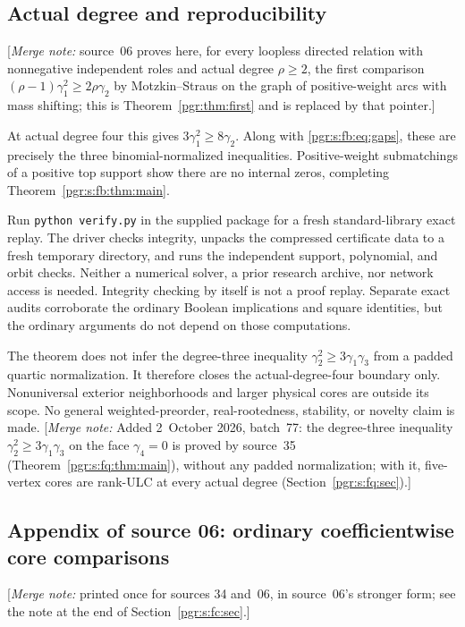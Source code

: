 \documentclass[11pt]{article}
\numberwithin{equation}{section}
\theoremstyle{definition}\newtheorem{definition}[theorem]{Definition}\newtheorem{remark}[theorem]{Remark}
\newcommand{\mnote}[1]{[\textit{Merge note:} #1]}
\begin{document}
\subsection{Actual degree and reproducibility}

\mnote{source~06 proves here, for every loopless directed relation with
nonnegative independent roles and actual degree $\rho\ge2$, the first
comparison $(\rho-1)\gamma_1^2\ge2\rho\gamma_2$ by Motzkin--Straus on the
graph of positive-weight arcs with mass shifting; this is
Theorem~\ref{pgr:thm:first} and is replaced by that pointer.}

At actual degree four this gives $3\gamma_1^2\ge8\gamma_2$. Along with \eqref{pgr:s:fb:eq:gaps}, these are precisely the three binomial-normalized inequalities. Positive-weight submatchings of a positive top support show there are no internal zeros, completing Theorem~\ref{pgr:s:fb:thm:main}.

Run \texttt{python verify.py} in the supplied package for a fresh standard-library exact replay. The driver checks integrity, unpacks the compressed certificate data to a fresh temporary directory, and runs the independent support, polynomial, and orbit checks. Neither a numerical solver, a prior research archive, nor network access is needed. Integrity checking by itself is not a proof replay. Separate exact audits corroborate the ordinary Boolean implications and square identities, but the ordinary arguments do not depend on those computations.

The theorem does not infer the degree-three inequality $\gamma_2^2\ge3\gamma_1\gamma_3$ from a padded quartic normalization. It therefore closes the actual-degree-four boundary only. Nonuniversal exterior neighborhoods and larger physical cores are outside its scope. No general weighted-preorder, real-rootedness, stability, or novelty claim is made.
\mnote{Added 2~October 2026, batch~77: the degree-three inequality
$\gamma_2^2\ge3\gamma_1\gamma_3$ on the face $\gamma_4=0$ is proved by
source~35 (Theorem~\ref{pgr:s:fq:thm:main}), without any padded
normalization; with it, five-vertex cores are rank-ULC at every actual
degree (Section~\ref{pgr:s:fq:sec}).}


\subsection{Appendix of source 06: ordinary coefficientwise core comparisons}\label{pgr:s:fb:app:core}
\mnote{printed once for sources 34 and~06, in source~06's stronger form;
see the note at the end of Section~\ref{pgr:s:fc:sec}.}
\end{document}
